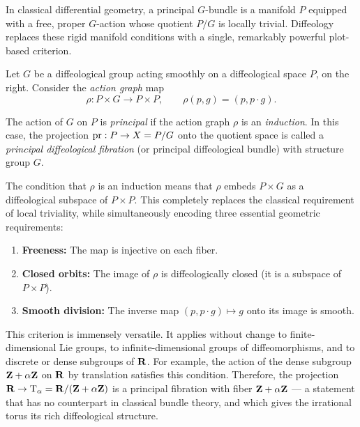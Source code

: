 \documentclass[10pt,reqno,letterpaper,twoside]{amsbook}
\begin{document}
  \begin{article}
    \label{art:Principal Diffeological Fiber Bundles}
    
    In classical differential geometry,
    a principal $G$-bundle is a manifold $P$ equipped with a free,
    proper $G$-action whose quotient $P/G$ is locally trivial.
    Diffeology replaces these rigid manifold conditions
    with a single, remarkably powerful plot-based criterion.
    
    Let $G$ be a diffeological group acting smoothly on a diffeological space $P$,
    on the right.
    Consider the \emph{action graph} map
    \[
      \rho: P \times G \to P \times P,
      \qquad
      \rho(p,g) = (p, p \cdot g).
      \]
    
    \begin{definition}
      The action of $G$ on $P$ is \emph{principal} if the action graph $\rho$
      is an \emph{induction}.
      In this case,
      the projection $\pr: P \to X = P/G$ onto the quotient space
      is called a \emph{principal diffeological fibration}
      (or principal diffeological bundle) with structure group $G$.
    \end{definition}
    
    The condition that $\rho$ is an induction means that $\rho$ embeds
    $P \times G$ as a diffeological subspace of $P \times P$.
    This completely replaces the classical requirement of local triviality,
    while simultaneously encoding three essential geometric requirements:
    \begin{enumerate}
      \item \textbf{Freeness:} The map is injective on each fiber.
      \item \textbf{Closed orbits:} The image of $\rho$ is diffeologically closed
      (it is a subspace of $P \times P$).
      \item \textbf{Smooth division:} The inverse map $(p, p \cdot g) \mapsto g$
      onto its image is smooth.
    \end{enumerate}
    
    This criterion is immensely versatile.
    It applies without change to finite-dimensional Lie groups,
    to infinite-dimensional groups of diffeomorphisms,
    and to discrete or dense subgroups of ${\mathbf{R}}$.
    For example,
    the action of the dense subgroup ${\mathbf{Z}} + \alpha{\mathbf{Z}}$ on ${\mathbf{R}}$ by translation
    satisfies this condition.
    Therefore,
    the projection ${\mathbf{R}} \to \mathrm{T}_\alpha = {\mathbf{R}}/({\mathbf{Z}} + \alpha{\mathbf{Z}})$
    is a principal fibration with fiber ${\mathbf{Z}} + \alpha{\mathbf{Z}}$ ---
    a statement that has no counterpart in classical bundle theory,
    and which gives the irrational torus its rich diffeological structure.
    

\end{article}
\end{document}
